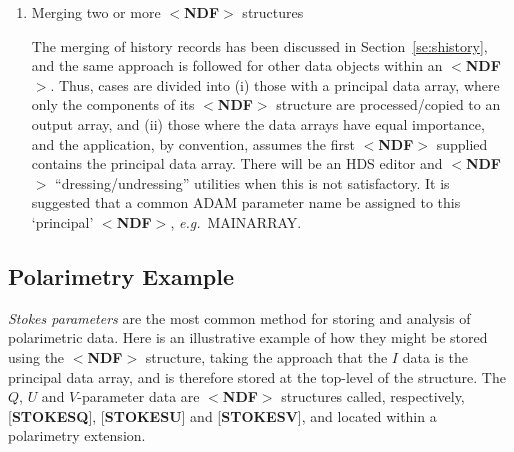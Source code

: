 \documentclass[twoside,11pt]{article}
\newcommand{\htmlref}[2]{#1}
\newenvironment{latexonly}{}{}
\newcommand{\html}[1]{}
\newcommand{\latex}[1]{#1}
\newcommand{\xlabel}[1]{}
\renewcommand{\_}{\texttt{\symbol{95}}}
\begin{document}
\begin{enumerate}
\begin{latexonly}
\begin{tabbing}
\end{tabbing}
\end{latexonly}

\begin{htmlonly}
\begin{quote}

name~~~~~~~~~~special\_type\\
~~~{[}{\bf name1}{]}~~~~~~$<${\bf NDF}$>$ \\
~~~~~~~$\vdots$~~~~~~~~~~~~~~~~~~$\vdots$\- \\
~~~{[}{\bf name2}{]}~~~~~~$<${\bf NDF}$>$ \\
~~~~~~~$\vdots$~~~~~~~~~~~~~~~~~~$\vdots$\- \\
~~~{[}{\bf name3}{]}~~~~~~$<${\bf NDF}$>$ \\
~~~~~~~$\vdots$~~~~~~~~~~~~~~~~~~$\vdots$\- \\

\end{quote}
\end{htmlonly}

Another approach would be to use an HDS array, each
element of which is an NDF.

\item Merging two or more $<${\bf NDF}$>$ structures

The merging of history records has been discussed 
in \latex{Section~\ref{se:shistory},}\html{\htmlref{$<${\bf
HISTORY}$>$ Structure,}{se:shistory}} and the same approach
is followed for other data objects within an $<${\bf NDF}$>$.
Thus, cases are divided into (i)
those with a principal data array, where only the
components of its $<${\bf NDF}$>$ structure are
processed/copied to an output array, and
(ii) those where the
data arrays have equal importance, and
the application, by convention, assumes the first $<${\bf NDF}$>$ supplied
contains the
principal data array.  There will be an HDS editor and $<${\bf NDF}$>$
``dressing/undressing'' utilities when this is not satisfactory.  It is
suggested that a common {\small ADAM} parameter name be assigned to this `principal'
$<${\bf NDF}$>$, {\it e.g.}\  MAIN\_ARRAY.
\end{enumerate}

\xlabel{se_expolarimetry}\subsection{Polarimetry Example\label{se:expolarimetry}}

{\it Stokes parameters} are the most common method for storing and analysis
of polarimetric data.  Here is an illustrative
example of how they might be stored
using the $<${\bf NDF}$>$ structure, taking the approach that
the $I$ data is the principal data array, and is therefore
stored at the top-level of the structure.  The $Q$, $U$ and $V$-parameter data
are $<${\bf NDF}$>$ structures called, respectively,
{[}{\bf STOKES\_Q}{]}, {[}{\bf STOKES\_U}{]}
and {[}{\bf STOKES\_V}{]}, and
located within a polarimetry extension.
\end{document}
